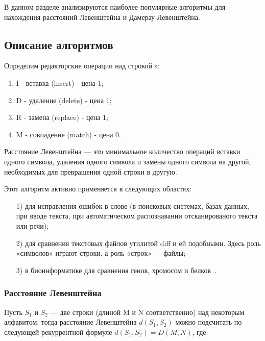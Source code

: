 \documentclass[a4paper,12pt]{article}
\begin{document}
	В данном разделе анализируются наиболее популярные алгоритмы для нахождения расстояний Левенштейна и Дамерау-Левенштейна. 
	
 
	
	\subsection{Описание алгоритмов}
		Определим редакторские операции над строкой s:
		    \begin{enumerate} 
		        \item I - вставка (insert) - цена 1;
		        \item D - удаление (delete) - цена 1;
		        \item R - замена (replace) - цена 1;
		        \item M - совпадение (match) - цена 0.
		    \end{enumerate} 
		    
		Расстояние Левенштейна  — это минимальное количество операций вставки одного символа, удаления одного символа и замены одного символа на 
другой, необходимых для превращения одной строки в другую.
		     
		Этот алгоритм активно применяется в следующих областях:
	\begin{enumerate}
	\item[1)]для исправления ошибок в слове (в поисковых системах, базах данных, при вводе текста, при автоматическом распознавании отсканированого текста или речи);
	\item[2)]для сравнения текстовых файлов утилитой diff и ей подобными. Здесь роль «символов» играют строки, а роль «строк» — файлы;
	\item[3)]в биоинформатике для сравнения генов, хромосом и белков~\cite{primenenie}.
	\end{enumerate}
	
	    \subsubsection{Расстояние Левенштейна}
	   
		    
		     Пусть $S_{1}$ и $S_{2}$ — две строки (длиной M и N соответственно) над 
		     некоторым алфавитом, тогда расстояние Левенштейна $d(S_{1}, S_{2})$ 
		     можно подсчитать по следующей рекуррентной формуле $d(S_{1}, S_{2}) = 
		     D(M, N)$, где:	    
		    
\end{document}
